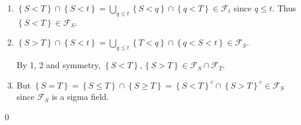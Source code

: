 \begin{problem}[7.3.5] \hfill

	\begin{enumerate}
		\item $\left\{ S< T \right\} \cap \left\{ S < t \right\} = \bigcup_{q \le t} \left\{ S< q \right\} \cap \left\{ q < T \right\} \in \mathcal{F}_t$ since $q\le t$.
			Thus $\left\{ S<T \right \} \in \mathcal{F}_S$.

		\item $\left\{ S > T \right\} \cap \left\{ S < t \right\} = \bigcup_{q \le t } \left\{ T < q \right\} \cap \left\{ q < S < t \right\} \in \mathcal{F}_S$.

			By 1, 2 and symmetry, $\left\{ S<T \right\}, \left\{ S>T \right\} \in \mathcal{F}_S \cap \mathcal{F}_T$.

		\item But $\left\{ S = T \right\} = \left\{ S \le T \right\} \cap \left\{ S \ge T \right\} = \left\{ S < T \right\}^c \cap \left\{ S > T \right\}^c \in \mathcal{F}_S$ since $\mathcal{F}_S$ is a sigma field.
	\end{enumerate}

	\qed
\end{problem}

